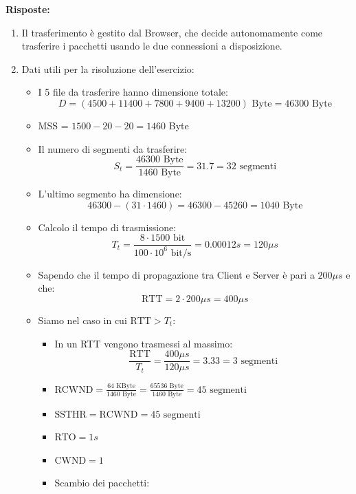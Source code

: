 \documentclass[10pt,a4paper]{article}
\begin{document}
	\textbf{Risposte:}
	\begin{enumerate}
		\item Il trasferimento è gestito dal Browser, che decide autonomamente come trasferire i pacchetti usando le due connessioni a disposizione.
		\item Dati utili per la risoluzione dell'esercizio:
		\begin{itemize}
			\item I 5 file da trasferire hanno dimensione totale: $$D = (4500 + 11400 + 7800 + 9400 + 13200) \textrm{ Byte} = 46300 \textrm { Byte}$$
			\item MSS = $1500 - 20 - 20 = 1460$ Byte
			\item Il numero di segmenti da trasferire: $$S_t = \frac{46300 \textrm{ Byte}}{1460 \textrm{ Byte}} = 31.7 = 32\textrm{ segmenti}$$
			\item L'ultimo segmento ha dimensione: $$46300 - (31 \cdot 1460) = 46300 - 45260 = 1040 \textrm{ Byte}$$
			\item Calcolo il tempo di trasmissione: $$T_t = \frac{8 \cdot 1500 \textrm{ bit}}{100  \cdot 10^6 \textrm{ bit/s}} = 0.00012 s = 120 \mu s$$
			\item Sapendo che il tempo di propagazione tra Client e Server è pari a $200 \mu s$ e che: $$\textrm{RTT} = 2 \cdot 200 \mu s = 400 \mu s$$
			\item Siamo nel caso in cui $\textrm{RTT} > T_t$:
			\begin{itemize}
				\item In un RTT vengono trasmessi al massimo: $$\frac{\textrm{RTT}}{T_t} = \frac{400 \mu s}{120 \mu s} = 3.33 = 3 \textrm{ segmenti}$$
				\item $\textrm{RCWND} = \displaystyle{\frac{64 \text{ KByte}}{1460 \textrm{ Byte}} = \frac{65536 \text{ Byte}}{1460 \textrm{ Byte}} = 45 \textrm{ segmenti}}$
				\item $\textrm{SSTHR} = \textrm{RCWND} = 45 \textrm{ segmenti}$
				\item $\textrm{RTO} = 1s$
				\item $\textrm{CWND} = 1$
				\item Scambio dei pacchetti:
				\begin{figure}[H]
					\centering

\end{figure}
\end{itemize}
\end{itemize}
\end{enumerate}
\end{document}
